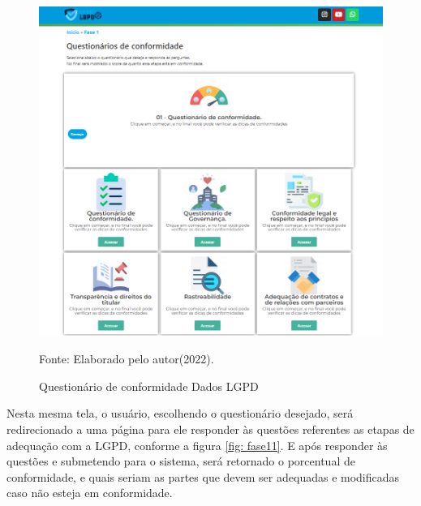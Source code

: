 \documentclass[
	12pt,				%
	openright,			%
	oneside,			%
	a4paper,			%
	english,			%
	french,				%
	spanish,			%
	brazil,				%
	]{abntex2}
\begin{document}
\begin{figure}[ht]
    \centering
    \caption{Questionário de conformidade Dados LGPD}
    \includegraphics[width=6.6in]{Images/fase1.png}
    \label{fig: homepage}
    
    \centering \small Fonte: Elaborado pelo autor(2022).
\end{figure}

Nesta mesma tela, o usuário, escolhendo o questionário desejado, será redirecionado a uma página para ele responder às questões referentes as etapas de adequação com a LGPD, conforme a figura \ref{fig: fase11}. E após responder às questões e submetendo para o sistema, será retornado o porcentual de conformidade, e quais seriam as partes que devem ser adequadas e modificadas caso não esteja em conformidade.
\end{document}
